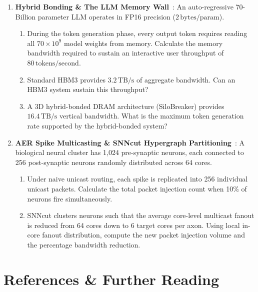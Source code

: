 \begin{enumerate}
    \item \textbf{Hybrid Bonding \& The LLM Memory Wall}~\cite{Wu2026Silo}: An auto-regressive 70-Billion parameter LLM operates in FP16 precision ($2\,\mathrm{bytes/param}$).
    \begin{enumerate}
        \item During the token generation phase, every output token requires reading all $70 \times 10^9$ model weights from memory. Calculate the memory bandwidth required to sustain an interactive user throughput of $80\,\mathrm{tokens/second}$.
        \item Standard HBM3 provides $3.2\,\mathrm{TB/s}$ of aggregate bandwidth. Can an HBM3 system sustain this throughput?
        \item A 3D hybrid-bonded DRAM architecture (SiloBreaker) provides $16.4\,\mathrm{TB/s}$ vertical bandwidth. What is the maximum token generation rate supported by the hybrid-bonded system?
    \end{enumerate}

    \item \textbf{AER Spike Multicasting \& SNNcut Hypergraph Partitioning}~\cite{Xing2026SNNcut}: A biological neural cluster has 1,024 pre-synaptic neurons, each connected to 256 post-synaptic neurons randomly distributed across 64 cores.
    \begin{enumerate}
        \item Under naive unicast routing, each spike is replicated into 256 individual unicast packets. Calculate the total packet injection count when 10\% of neurons fire simultaneously.
        \item SNNcut clusters neurons such that the average core-level multicast fanout is reduced from 64 cores down to 6 target cores per axon. Using local in-core fanout distribution, compute the new packet injection volume and the percentage bandwidth reduction.
    \end{enumerate}
\end{enumerate}

\section{References \& Further Reading}
\label{sec:ch12_references}

